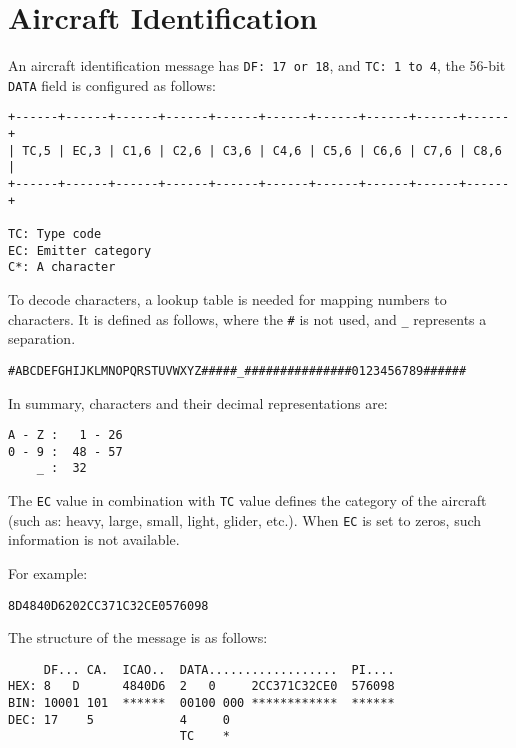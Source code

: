 \section{Aircraft Identification}\label{aircraft-identification}

An aircraft identification message has \texttt{DF:\ 17\ or\ 18}, and \texttt{TC:\ 1\ to\ 4}, the 56-bit \texttt{DATA} field is configured as follows:

\begin{verbatim}
+------+------+------+------+------+------+------+------+------+------+
| TC,5 | EC,3 | C1,6 | C2,6 | C3,6 | C4,6 | C5,6 | C6,6 | C7,6 | C8,6 |
+------+------+------+------+------+------+------+------+------+------+

TC: Type code
EC: Emitter category
C*: A character
\end{verbatim}

To decode characters, a lookup table is needed for mapping numbers to characters. It is defined as follows, where the \texttt{\#} is not used, and \texttt{\_} represents a separation.

\begin{verbatim}
#ABCDEFGHIJKLMNOPQRSTUVWXYZ#####_###############0123456789######
\end{verbatim}

In summary, characters and their decimal representations are:

\begin{verbatim}
A - Z :   1 - 26
0 - 9 :  48 - 57
    _ :  32
\end{verbatim}

The \texttt{EC} value in combination with \texttt{TC} value defines the category of the aircraft (such as: heavy, large, small, light, glider, etc.). When \texttt{EC} is set to zeros, such information is not available.

For example:

\begin{verbatim}
8D4840D6202CC371C32CE0576098
\end{verbatim}

The structure of the message is as follows:

\begin{verbatim}
     DF... CA.  ICAO..  DATA..................  PI....
HEX: 8   D      4840D6  2   0     2CC371C32CE0  576098
BIN: 10001 101  ******  00100 000 ************  ******
DEC: 17    5            4     0
                        TC    *
\end{verbatim}


